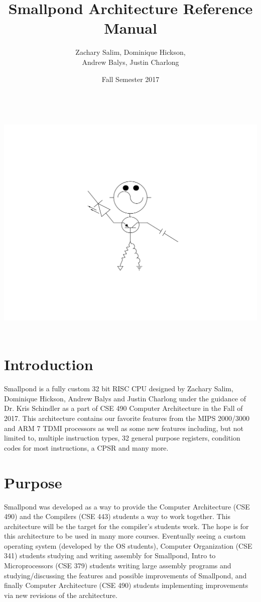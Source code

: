 \documentclass[12pt]{article}
\title{Smallpond Architecture Reference Manual}
\author{Zachary Salim, Dominique Hickson,\\ Andrew Balys, Justin Charlong}
\date{Fall Semester 2017}
\begin{document}
\maketitle

\begin{center}
    \includegraphics[width=15cm, height=11.6cm]{Volty.png}
\end{center}

\newpage
\tableofcontents

\newpage
\section{Introduction}
Smallpond is a fully custom 32 bit RISC CPU designed by Zachary Salim, Dominique Hickson, Andrew Balys and Justin Charlong under the guidance of Dr. Kris Schindler as a part of CSE 490 Computer Architecture in the Fall of 2017. This architecture contains our favorite features from the MIPS 2000/3000 and ARM 7 TDMI processors as well as some new features including, but not limited to, multiple instruction types, 32 general purpose registers, condition codes for most instructions, a CPSR and many more.

\section{Purpose}
Smallpond was developed as a way to provide the Computer Architecture (CSE 490) and the Compilers (CSE 443) students a way to work together. This architecture will be the target for the compiler's students work. The hope is for this architecture to be used in many more courses. Eventually seeing a custom operating system (developed by the OS students), Computer Organization (CSE 341) students studying and writing assembly for Smallpond, Intro to Microprocessors (CSE 379) students writing large assembly programs and studying/discussing the features and possible improvements of Smallpond, and finally Computer Architecture (CSE 490) students implementing improvements via new revisions of the architecture. 
\end{document}
